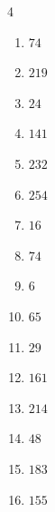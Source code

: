 \begin{multicols}{4}
\begin{enumerate}
  \item $74$


  \item $219$


  \item $24$


  \item $141$


  \item $232$


  \item $254$


  \item $16$


  \item $74$


  \item $6$


\columnbreak %

  \item $65$


  \item $29$


  \item $161$


  \item $214$


  \item $48$


  \item $183$


  \item $155$


\end{enumerate}
\end{multicols}

